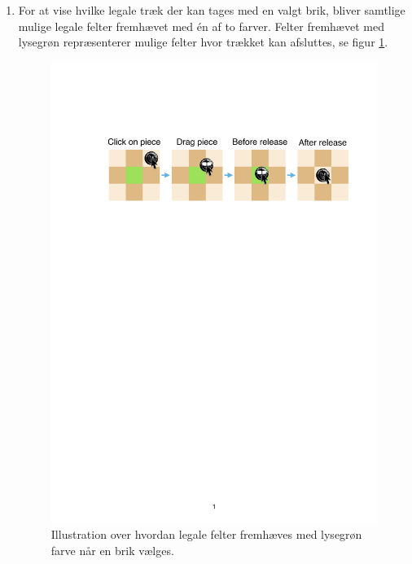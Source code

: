 \begin{enumerate}
    \item For at vise hvilke legale træk der kan tages med en valgt brik, bliver samtlige mulige legale felter fremhævet med én af to farver. Felter fremhævet med lysegrøn repræsenterer mulige felter hvor trækket kan afsluttes, se figur \ref{fig:MovePieceFigure}. \begin{figure}[H]
        \centering
        \includegraphics[width = \textwidth]{Figurer/MovePieceFigure}
        \caption{Illustration over hvordan legale felter fremhæves med lysegrøn farve når en brik vælges.}
        \label{fig:MovePieceFigure}
    \end{figure}


\end{enumerate}
